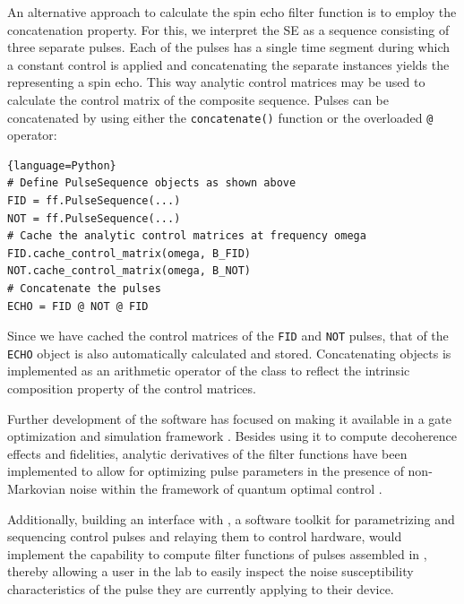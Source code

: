 An alternative approach to calculate the spin echo filter function is to employ the concatenation property. For this, we interpret the SE as a sequence consisting of three separate pulses. Each of the pulses has a single time segment during which a constant control is applied and concatenating the separate \pulsesequence instances yields the \pulsesequence representing a spin echo. This way analytic control matrices may be used to calculate the control matrix of the composite sequence. Pulses can be concatenated by using either the \verb|concatenate()| function or the overloaded \verb|@| operator:
\begin{lstlisting}{language=Python}
# Define PulseSequence objects as shown above
FID = ff.PulseSequence(...)
NOT = ff.PulseSequence(...)
# Cache the analytic control matrices at frequency omega
FID.cache_control_matrix(omega, B_FID)
NOT.cache_control_matrix(omega, B_NOT)
# Concatenate the pulses
ECHO = FID @ NOT @ FID
\end{lstlisting}
Since we have cached the control matrices of the \texttt{FID} and \texttt{NOT} pulses, that of the \texttt{ECHO} object is also automatically calculated and stored. Concatenating \pulsesequence objects is implemented as an arithmetic operator of the class to reflect the intrinsic composition property of the control matrices.

Further development of the software has focused on making it available in a gate optimization and simulation framework \cite{qopt,Teske2021}. Besides using it to compute decoherence effects and fidelities, analytic derivatives of the filter functions have been implemented to allow for optimizing pulse parameters in the presence of non-Markovian noise within the framework of quantum optimal control \cite{Le2021}.

Additionally, building an interface with \qupulse \cite{qupulse,Humpohl2021}, a software toolkit for parametrizing and sequencing control pulses and relaying them to control hardware, would implement the capability to compute filter functions of pulses assembled in \qupulse, thereby allowing a user in the lab to easily inspect the noise susceptibility characteristics of the pulse they are currently applying to their device.

